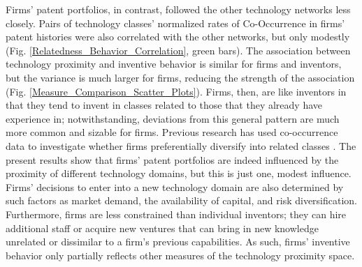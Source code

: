 \documentclass[]{svjour3}
\begin{document}
Firms' patent portfolios, in contrast, followed the other technology networks less closely. Pairs of technology classes' normalized rates of Co-Occurrence in firms' patent histories were also correlated with the other networks, but only modestly (Fig. \ref{Relatedness_Behavior_Correlation}, green bars). The association between technology proximity and inventive behavior is similar for firms and inventors, but the variance is much larger for firms, reducing the strength of the association (Fig. \ref{Measure_Comparison_Scatter_Plots}). Firms, then, are like inventors in that they tend to invent in classes related to those that they already have experience in; notwithstanding, deviations from this general pattern are much more common and sizable for firms. Previous research has used co-occurrence data to investigate whether firms preferentially diversify into related classes \citep{Bottazzi2010, Breschi2003, Teece1994}. The present results show that firms' patent portfolios are indeed influenced by the proximity of different technology domains, but this is just one, modest influence. Firms' decisions to enter into a new technology domain are also determined by such factors as market demand, the availability of capital, and risk diversification. Furthermore, firms are less constrained than individual inventors; they can hire additional staff or acquire new ventures that can bring in new knowledge unrelated or dissimilar to a firm's previous capabilities. As such, firms' inventive behavior only partially reflects other measures of the technology proximity space. 
\end{document}
